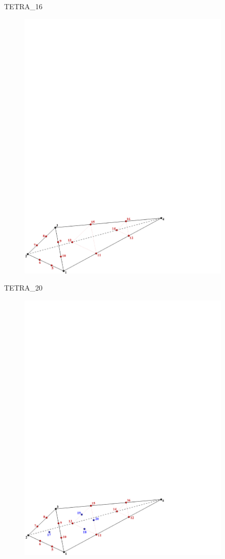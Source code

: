 {{{TETRA\_16
\begin{figure}[!htb]
   \includegraphics[width=4in]{conv.figs/TecplotFiles_Cubic_Element/All_Figures/tetra_16}
\end{figure}

\bigskip

TETRA\_20
\begin{figure}[!htb]
   \includegraphics[width=4in]{conv.figs/TecplotFiles_Cubic_Element/All_Figures/tetra_20}
\end{figure}

}}}
